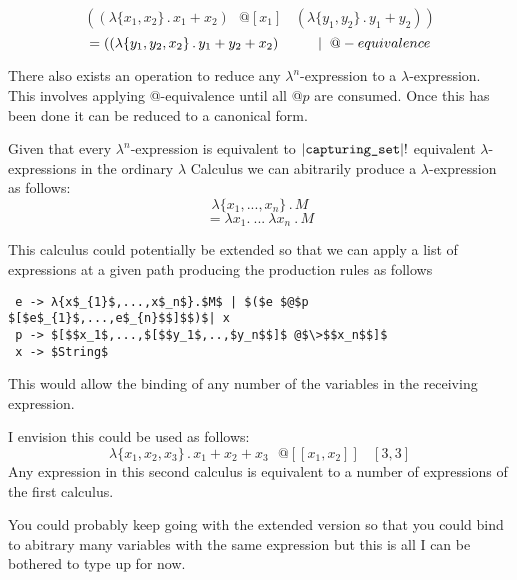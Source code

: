 \documentclass{article}
\begin{document}
\begin{equation}
    ((\lambda\{x_1, x_2\}\,.\, x_1 + x_2) \>\>\>@[x_1]\>\>\>\>(\lambda\{y_1, y_2\}\,.\, y_1 + y_2)) 
\end{equation}
\begin{equation}
   = ((\lambda\{y_1, y_2, x_2\}\,.\, y_1 + y_2 + x_2) \hspace{10mm}|\hspace{2mm}@-equivalence
\end{equation}

\noindent There also exists an operation to reduce any $\lambda^n$-expression to a $\lambda$-expression. This involves applying @-equivalence until all @$p$ are consumed. Once this has been done it can be reduced to a canonical form.

\noindent Given that every $\lambda^{n}$-expression is equivalent to $|\verb|capturing_set||!$ equivalent $\lambda$-expressions in the ordinary $\lambda$ Calculus we can abitrarily produce a $\lambda$-expression as follows: 
\begin{equation}
    \lambda\{x_1,..., x_n\}\,.\,M
\end{equation}
\begin{equation}
   = \lambda x_1 .\>...\>\lambda x_n\>.\,M  
\end{equation}
\par
\noindent This calculus could potentially be extended so that we can apply a list of expressions at a given path producing the production rules as follows
\begin{lstlisting}
 e -> λ{x$_{1}$,...,x$_n$}.$M$ | $($e $@$p $[$e$_{1}$,...,e$_{n}$$]$$)$| x
 p -> $[$$x_1$,...,$[$$y_1$,..,$y_n$$]$ @$\>$$x_n$$]$
 x -> $String$
\end{lstlisting}
\vspace{-5mm}
\noindent This would allow the binding of any number of the variables in the receiving expression. 

\noindent I envision this could be used as follows:
\begin{equation}
    \lambda\{x_1,x_2,x_3\}\,.\,x_1 + x_2 + x_3 \>\>\>@[[x_1, x_2]]\>\>\>\>[3,3]
\end{equation}
\noindent Any expression in this second calculus is equivalent to a number of expressions of the first calculus.

\noindent You could probably keep going with the extended version so that you could bind to abitrary many variables with the same expression but this is all I can be bothered to type up for now.
\end{document}
